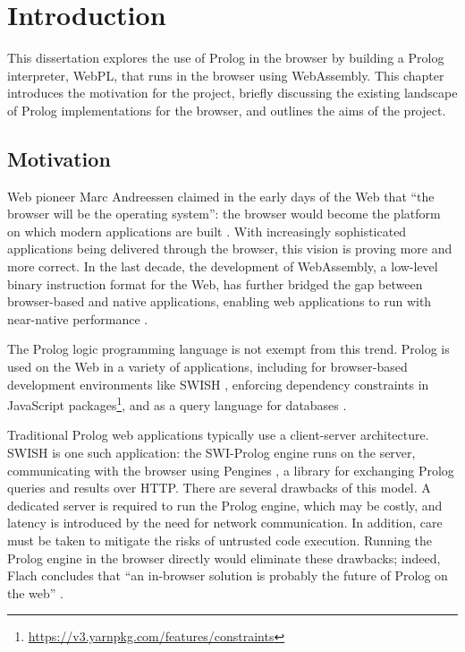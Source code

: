 \chapter{Introduction}

This dissertation explores the use of Prolog in the browser by building a Prolog interpreter, WebPL, that runs in the browser using WebAssembly. This chapter introduces the motivation for the project, briefly discussing the existing landscape of Prolog implementations for the browser, and outlines the aims of the project.

\section{Motivation}

\label{sec:motivation}

Web pioneer Marc Andreessen claimed in the early days of the Web that ``the browser will be the operating system'': the browser would become the platform on which modern applications are built \cite{kosnerAlwaysEarlyMarc2012}. With increasingly sophisticated applications being delivered through the browser, this vision is proving more and more correct. In the last decade, the development of WebAssembly, a low-level binary instruction format for the Web, has further bridged the gap between browser-based and native applications, enabling web applications to run with near-native performance \cite{haasBringingwebspeed2017}.

The Prolog logic programming language is not exempt from this trend. Prolog is used on the Web in a variety of applications, including for browser-based development environments like SWISH \cite{wielemakerSWISHSWIPrologSharing2015}, enforcing dependency constraints in JavaScript packages\footnote{\url{https://v3.yarnpkg.com/features/constraints}}, and as a query language for databases \cite{wielemakerUsingPrologFundament2007}.

Traditional Prolog web applications typically use a client-server architecture. SWISH is one such application: the SWI-Prolog engine runs on the server, communicating with the browser using Pengines \cite{lagerPenginesWebLogic2014}, a library for exchanging Prolog queries and results over HTTP. There are several drawbacks of this model. A dedicated server is required to run the Prolog engine, which may be costly, and latency is introduced by the need for network communication. In addition, care must be taken to mitigate the risks of untrusted code execution. Running the Prolog engine in the browser directly would eliminate these drawbacks; indeed, Flach concludes that ``an in-browser solution is probably the future of Prolog on the web'' \cite{flachSimplyLogicalFirst2023}.

